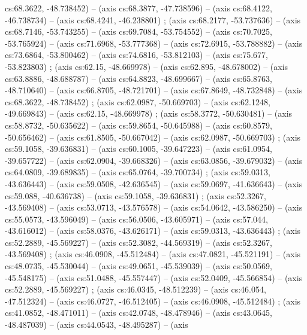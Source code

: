   cs:68.3622, -48.738452) -- (axis cs:68.3877, -47.738596) -- (axis
  cs:68.4122, -46.738734) -- (axis cs:68.4241, -46.238801)
  ;  (axis cs:68.2177, -53.737636) -- (axis
  cs:68.7146, -53.743255) -- (axis cs:69.7084, -53.754552) -- (axis
  cs:70.7025, -53.765924) -- (axis cs:71.6968, -53.777368) -- (axis
  cs:72.6915, -53.788882) -- (axis cs:73.6864, -53.800462) -- (axis
  cs:74.6816, -53.812103) -- (axis cs:75.677, -53.823803)
  ;  (axis cs:62.15, -48.669978) -- (axis
  cs:62.895, -48.678002) -- (axis cs:63.8886, -48.688787) -- (axis cs:64.8823,
  -48.699667) -- (axis cs:65.8763, -48.710640) -- (axis cs:66.8705,
  -48.721701) -- (axis cs:67.8649, -48.732848) -- (axis cs:68.3622,
  -48.738452) ;  (axis cs:62.0987, -50.669703) --
  (axis cs:62.1248, -49.669843) -- (axis cs:62.15, -48.669978)
  ;  (axis cs:58.3772, -50.630481) -- (axis
  cs:58.8732, -50.635622) -- (axis cs:59.8654, -50.645988) -- (axis
  cs:60.8579, -50.656462) -- (axis cs:61.8505, -50.667042) -- (axis
  cs:62.0987, -50.669703) ;  (axis cs:59.1058,
  -39.636831) -- (axis cs:60.1005, -39.647223) -- (axis cs:61.0954,
  -39.657722) -- (axis cs:62.0904, -39.668326) -- (axis cs:63.0856,
  -39.679032) -- (axis cs:64.0809, -39.689835) -- (axis cs:65.0764,
  -39.700734) ;  (axis cs:59.0313, -43.636443) --
  (axis cs:59.0508, -42.636545) -- (axis cs:59.0697, -41.636643) -- (axis
  cs:59.088, -40.636738) -- (axis cs:59.1058, -39.636831)
  ;  (axis cs:52.3267, -43.569408) -- (axis
  cs:53.0713, -43.576578) -- (axis cs:54.0642, -43.586250) -- (axis
  cs:55.0573, -43.596049) -- (axis cs:56.0506, -43.605971) -- (axis cs:57.044,
  -43.616012) -- (axis cs:58.0376, -43.626171) -- (axis cs:59.0313,
  -43.636443) ;  (axis cs:52.2889, -45.569227) --
  (axis cs:52.3082, -44.569319) -- (axis cs:52.3267, -43.569408)
  ;  (axis cs:46.0908, -45.512484) -- (axis
  cs:47.0821, -45.521191) -- (axis cs:48.0735, -45.530044) -- (axis
  cs:49.0651, -45.539039) -- (axis cs:50.0569, -45.548175) -- (axis
  cs:51.0488, -45.557447) -- (axis cs:52.0409, -45.566854) -- (axis
  cs:52.2889, -45.569227) ;  (axis cs:46.0345,
  -48.512239) -- (axis cs:46.054, -47.512324) -- (axis cs:46.0727, -46.512405)
  -- (axis cs:46.0908, -45.512484) ;  (axis
  cs:41.0852, -48.471011) -- (axis cs:42.0748, -48.478946) -- (axis
  cs:43.0645, -48.487039) -- (axis cs:44.0543, -48.495287) -- (axis
